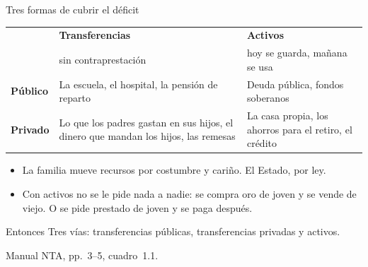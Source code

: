 \documentclass[aspectratio=169,11pt]{beamer}
\newcommand{\fuente}[1]{\par\vfill{\small\color{cGris}#1\par}}
\begin{document}
\begin{frame}{Tres formas de cubrir el déficit}
  \centering
  \begin{tabular}{@{}l>{\raggedright\arraybackslash}p{5.2cm}>{\raggedright\arraybackslash}p{5.2cm}@{}}
    \toprule
    & \textbf{Transferencias} & \textbf{Activos} \\
    & {\small sin contraprestación} & {\small hoy se guarda, mañana se usa} \\
    \midrule
    \textbf{Público} & La escuela, el hospital, la pensión de reparto & Deuda pública, fondos soberanos \\[0.3em]
    \textbf{Privado} & Lo que los padres gastan en sus hijos, el dinero que mandan los hijos, las remesas & La casa propia, los ahorros para el retiro, el crédito \\
    \bottomrule
  \end{tabular}
  \par\medskip\raggedright
  \pause
  \begin{itemize}
    \item La familia mueve recursos por costumbre y cariño. El Estado, por ley.
    \item Con activos no se le pide nada a nadie: se compra oro de joven y se vende de viejo. O se pide prestado de joven y se paga después.
  \end{itemize}
  \pause
  \begin{block}{Entonces}
    Tres vías: transferencias públicas, transferencias privadas y activos.
  \end{block}
  \fuente{Manual NTA, pp.~3--5, cuadro~1.1.}
\end{frame}
\end{document}
